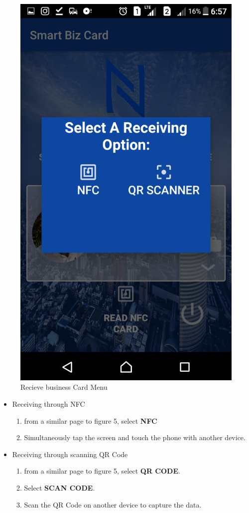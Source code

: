 \documentclass[english]{article}
\begin{document}
		\begin{figure}[H]
			\centering
			\includegraphics[scale=0.3]{Recieve.png}
			\caption{Recieve business Card Menu}
			\label{figure: 5}
		\end{figure}
	\begin{itemize}
		\item Receiving through NFC
		\begin{enumerate}
			\item from a similar page to figure 5, select \textbf{NFC}
			\item Simultaneously tap the screen and touch the phone with another device.
		\end{enumerate}
		\item Receiving through scanning QR Code
		\begin{enumerate}
			\item from a similar page to figure 5, select \textbf{QR CODE}.  
			\item Select \textbf{SCAN CODE}.
			\item Scan the QR Code on another device to capture the data.
		\end{enumerate}
	\end{itemize}
\end{document}
